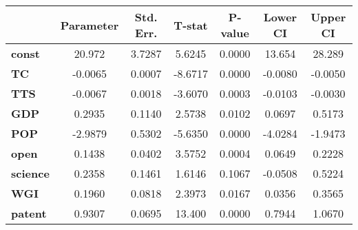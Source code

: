 \documentclass{article}
\begin{document}
\begin{center}
\begin{tabular}{lclc}
\end{tabular}
\begin{tabular}{lcccccc}
                 & \textbf{Parameter} & \textbf{Std. Err.} & \textbf{T-stat} & \textbf{P-value} & \textbf{Lower CI} & \textbf{Upper CI}  \\
\midrule
\textbf{const}   &       20.972       &       3.7287       &      5.6245     &      0.0000      &       13.654      &       28.289       \\
\textbf{TC}      &      -0.0065       &       0.0007       &     -8.6717     &      0.0000      &      -0.0080      &      -0.0050       \\
\textbf{TTS}     &      -0.0067       &       0.0018       &     -3.6070     &      0.0003      &      -0.0103      &      -0.0030       \\
\textbf{GDP}     &       0.2935       &       0.1140       &      2.5738     &      0.0102      &       0.0697      &       0.5173       \\
\textbf{POP}     &      -2.9879       &       0.5302       &     -5.6350     &      0.0000      &      -4.0284      &      -1.9473       \\
\textbf{open}    &       0.1438       &       0.0402       &      3.5752     &      0.0004      &       0.0649      &       0.2228       \\
\textbf{science} &       0.2358       &       0.1461       &      1.6146     &      0.1067      &      -0.0508      &       0.5224       \\
\textbf{WGI}     &       0.1960       &       0.0818       &      2.3973     &      0.0167      &       0.0356      &       0.3565       \\
\textbf{patent}  &       0.9307       &       0.0695       &      13.400     &      0.0000      &       0.7944      &       1.0670       \\
\bottomrule
\end{tabular}
\end{center}
\end{document}
